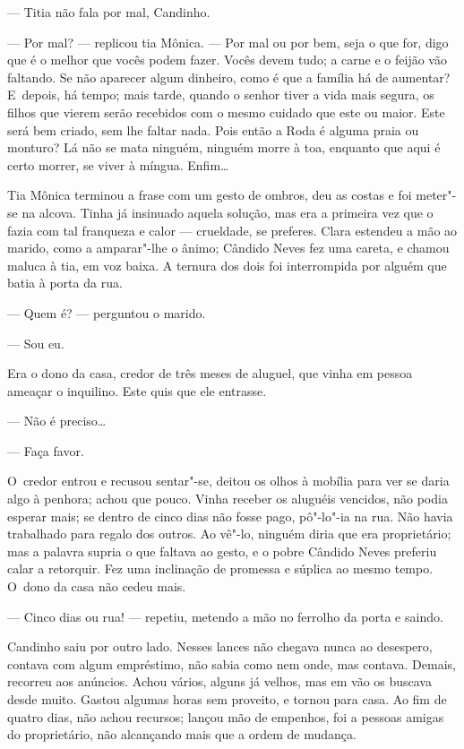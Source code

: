 \begin{linenumbers}
--- Titia não fala por mal, Candinho.

--- Por mal? --- replicou tia Mônica. --- Por mal ou por bem, seja o que
for, digo que é o melhor que vocês podem fazer. Vocês devem tudo; a
carne e o feijão vão faltando. Se não aparecer algum dinheiro, como é
que a família há de aumentar? E~depois, há tempo; mais tarde, quando o
senhor tiver a vida mais segura, os filhos que vierem serão recebidos
com o mesmo cuidado que este ou maior. Este será bem criado, sem lhe
faltar nada. Pois então a Roda é alguma praia ou monturo? Lá não se mata
ninguém, ninguém morre à toa, enquanto que aqui é certo morrer, se viver
à míngua. Enfim\ldots{}

Tia Mônica terminou a frase com um gesto de ombros, deu as costas e foi
meter"-se na alcova. Tinha já insinuado aquela solução, mas era a
primeira vez que o fazia com tal franqueza e calor --- crueldade, se
preferes. Clara estendeu a mão ao marido, como a amparar"-lhe o ânimo;
Cândido Neves fez uma careta, e chamou maluca à tia, em voz baixa. A
ternura dos dois foi interrompida por alguém que batia à porta da rua.

--- Quem é? --- perguntou o marido.

--- Sou eu.

Era o dono da casa, credor de três meses de aluguel, que vinha em pessoa
ameaçar o inquilino. Este quis que ele entrasse.

--- Não é preciso\ldots{}

--- Faça favor.

O~credor entrou e recusou sentar"-se, deitou os olhos à mobília para ver
se daria algo à penhora; achou que pouco. Vinha receber os aluguéis
vencidos, não podia esperar mais; se dentro de cinco dias não fosse
pago, pô"-lo"-ia na rua. Não havia trabalhado para regalo dos outros. Ao
vê"-lo, ninguém diria que era proprietário; mas a palavra supria o que
faltava ao gesto, e o pobre Cândido Neves preferiu calar a retorquir.
Fez uma inclinação de promessa e súplica ao mesmo tempo. O~dono da casa
não cedeu mais.

--- Cinco dias ou rua! --- repetiu, metendo a mão no ferrolho da porta e
saindo.

Candinho saiu por outro lado. Nesses lances não chegava nunca ao
desespero, contava com algum empréstimo, não sabia como nem onde, mas
contava. Demais, recorreu aos anúncios. Achou vários, alguns já velhos,
mas em vão os buscava desde muito. Gastou algumas horas sem proveito, e
tornou para casa. Ao fim de quatro dias, não achou recursos; lançou mão
de empenhos, foi a pessoas amigas do proprietário, não alcançando mais
que a ordem de mudança.


\end{linenumbers}
